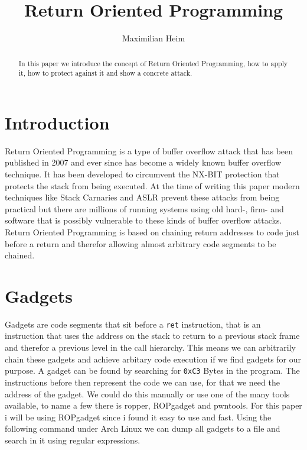 \documentclass[journal=tosc,submission]{iacrtrans}
\author{Maximilian Heim}
\institute{
  University Albstadt-Sigmaringen, Albstadt, Germany, \email{MaximilianHeim@protonmail.com}
}
\title{Return Oriented Programming}
\begin{document}
\maketitle




\begin{abstract}
  In this paper we introduce the concept of Return Oriented Programming, how to apply it, how to protect against it and show a concrete attack.
\end{abstract}


\section{Introduction}

Return Oriented Programming is a type of buffer overflow attack that has been published in 2007 and ever since has become a widely known buffer overflow technique. It has been developed to circumvent the NX-BIT protection that protects the stack from being executed. At the time of writing this paper modern techniques like Stack Carnaries and ASLR prevent these attacks from being practical but there are millions of running systems using old hard-, firm- and software that is possibly vulnerable to these kinds of buffer overflow attacks. Return Oriented Programming is based on chaining return addresses to code just before a return and therefor allowing almost arbitrary code segments to be chained.


\section{Gadgets}
\label{sec:main}
Gadgets are code segments that sit before a \Verb+ret+ instruction, that is an instruction that uses the address on the stack to return to a previous stack frame and therefor a previous level in the call hierarchy. This means we can arbitrarily chain these gadgets and achieve arbitary code execution if we find gadgets for our purpose. A gadget can be found by searching for \Verb+0xC3+ Bytes in the program. The instructions before then represent the code we can use, for that we need the address of the gadget. We could do this manually or use one of the many tools available, to name a few there is ropper, ROPgadget and pwntools. For this paper i will be using ROPgadget since i found it easy to use and fast. Using the following command under Arch Linux we can dump all gadgets to a file and search in it using regular expressions.
\end{document}
